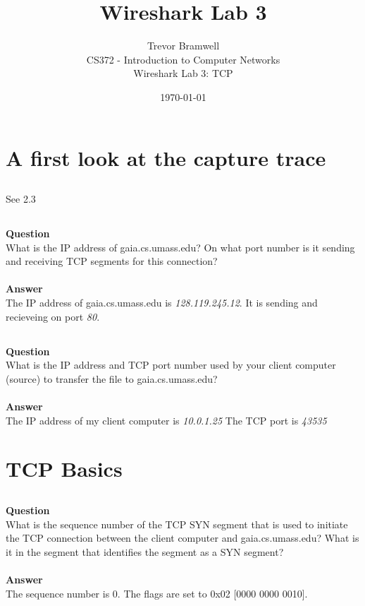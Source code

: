 \documentclass[12pt,letterpaper]{article}
\begin{document}
\title{Wireshark Lab 3}
\author{
    Trevor Bramwell \\
    CS372 - Introduction to Computer Networks \\
    Wireshark Lab 3: TCP
}
\date{\today}


\maketitle

\setcounter{section}{1}
\section{A first look at the capture trace}

\subsection{}
See 2.3

\subsection{}
\textbf{Question}\\
What is the IP address of gaia.cs.umass.edu? On what port number is it sending 
and receiving TCP segments for this connection?\\\\
\noindent\textbf{Answer}\\
The IP address of gaia.cs.umass.edu is \emph{128.119.245.12}. It is sending 
and recieveing on port \emph{80}.

\tiny

\normalsize

\subsection{}
\label{section3}
\textbf{Question}\\
What is the IP address and TCP port number used by your client computer 
(source) to transfer the file to gaia.cs.umass.edu?\\\\
\noindent\textbf{Answer}\\
The IP address of my client computer is \emph{10.0.1.25} The TCP port is \emph{43535}

\section{TCP Basics}
\setcounter{subsection}{3}
\subsection{}
\textbf{Question}\\
What is the sequence number of the TCP SYN segment that is used to initiate the
TCP connection between the client computer and gaia.cs.umass.edu? What is it
in the segment that identifies the segment as a SYN segment?\\\\
\noindent\textbf{Answer}\\
The sequence number is 0. The flags are set to 0x02 [0000 0000 0010].
\end{document}
